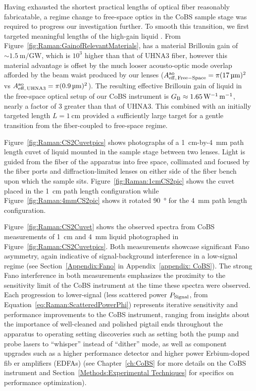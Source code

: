 Having exhausted the shortest practical lengths of optical fiber reasonably fabricatable, a regime change to free-space optics in the \ac{CoBS} sample stage was required to progress our investigation further. To smooth this transition, we first targeted meaningful lengths of the high-gain liquid . From Figure~\ref{fig:Raman:GainofRelevantMaterials},  has a material Brillouin gain of \(\sim\SI{1.5}{\meter\per\giga\watt}\), which is \(10^{3}\) higher than that of \ac{UHNA3} fiber, however this material advantage is offset by the much looser acousto-optic mode overlap afforded by the beam waist produced by our lenses (\(A_{\rm eff,\,Free-Space}^{\rm ao} = \pi(\SI{17}{\micro\meter})^{2}\) vs \(A_{\rm eff,\,UHNA3}^{\rm ao} = \pi(\SI{0.9}{\micro\meter})^{2}\)). The resulting effective Brillouin gain of liquid  in the free-space optical setup of our \ac{CoBS} instrument is \(G_{\rm B} \approx \SI{1.65}{\per\watt\per\meter}\), nearly a factor of 3 greater than that of \ac{UHNA3}. This combined with an initially targeted length \(L = \SI{1}{\centi\meter}\) provided a sufficiently large target for a gentle transition from the fiber-coupled to free-space regime.

Figure~\ref{fig:Raman:CS2Cuvetpics} shows photographs of a \SI{1}{\centi\meter}-by-\SI{4}{\milli\meter} path length cuvet of liquid  mounted in the sample stage between two lenses. Light is guided from the fiber of the apparatus into free space, collimated and focused by the fiber ports and diffraction-limited lenses on either side of the fiber bench upon which the sample sits. Figure~\ref{fig:Raman:1cmCS2pic} shows the cuvet placed in the \SI{1}{\centi\meter} path length configuration while Figure~\ref{fig:Raman:4mmCS2pic} shows it rotated \SI{90}{\degree} for the \SI{4}{\milli\meter} path length configuration.

Figure~\ref{fig:Raman:CS2Cuvet} shows the observed spectra from \ac{CoBS} measurements of \SI{1}{\centi\meter} and \SI{4}{\milli\meter} liquid  photographed in Figure~\ref{fig:Raman:CS2Cuvetpics}. Both measurements showcase significant Fano asymmetry, again indicative of signal-background interference in a low-signal regime (see Section~\ref{Appendix:Fano} in Appendix~\ref{appendix: CoBS}). The strong Fano interference in both measurements emphasizes the proximity to the sensitivity limit of the \ac{CoBS} instrument at the time these spectra were observed. Each progression to lower-signal (less scattered power \(P_{\rm Signal}\), from Equation~\ref{eq:Raman:ScatteredPowerPhi}) represents iterative sensitivity and performance improvements to the \ac{CoBS} instrument, ranging from insights about the importance of well-cleaned and polished pigtail ends throughout the apparatus to operating setting discoveries such as setting both the pump and probe lasers to ``whisper'' instead of ``dither'' mode, as well as component upgrades such as a higher performance detector and higher power Erbium-doped fib er amplifiers (\acs{EDFA}s) (see Chapter~\ref{ch:CoBS} for more details on the \ac{CoBS} instrument and Section~\ref{Methods:Experimental Techniques} for specifics on performance optimization).

